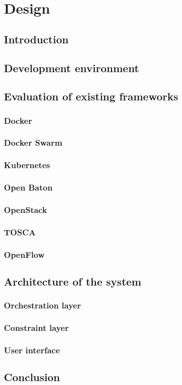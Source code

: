 \chapter{Design}

\section{Introduction}

\section{Development environment}

\section{Evaluation of existing frameworks}

\subsection{Docker}

\subsection{Docker Swarm}

\subsection{Kubernetes}

\subsection{Open Baton}

\subsection{OpenStack}

\subsection{TOSCA}

\subsection{OpenFlow}

\section{Architecture of the system}

\subsection{Orchestration layer}

\subsection{Constraint layer}

\subsection{User interface}

\section{Conclusion}
